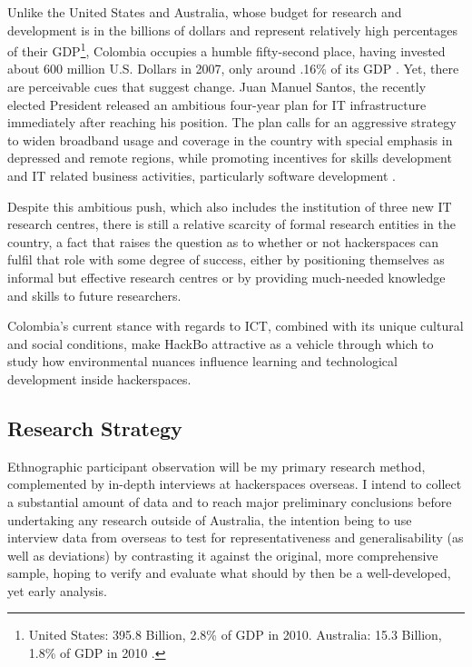 Unlike the United States and Australia, whose budget for research and development is in the billions of dollars and represent relatively high percentages of their GDP\footnote{United States: 395.8 Billion, 2.8\% of GDP in 2010. Australia: 15.3 Billion, 1.8\% of GDP in 2010 \citep{wadsworth10}.}, Colombia occupies a humble fifty-second place, having invested about 600 million U.S. Dollars in 2007, only around .16\% of its GDP \citep[p.82]{unesco10}. Yet, there are perceivable cues that suggest change. Juan Manuel Santos, the recently elected President released an ambitious four-year plan for IT infrastructure immediately after reaching his position. The plan calls for an aggressive strategy to widen broadband usage and coverage in the country with special emphasis in depressed and remote regions, while promoting incentives for skills development and IT related business activities, particularly software development \citep{molano11}. 

Despite this ambitious push, which also includes the institution of three new IT research centres, there is still a relative scarcity of formal research entities in the country, a fact that raises the question as to whether or not hackerspaces can fulfil that role with some degree of success, either by positioning themselves as informal but effective research centres or by providing much-needed knowledge and skills to future researchers. 

Colombia's current stance with regards to ICT, combined with its unique cultural and social conditions, make HackBo attractive as a vehicle through which to study how environmental nuances influence learning and technological development inside hackerspaces.

\subsection{Research Strategy}
\label{strategy}

Ethnographic participant observation will be my primary research method, complemented by in-depth interviews at hackerspaces overseas. I intend to collect a substantial amount of data and to reach major preliminary conclusions before undertaking any research outside of Australia, the intention being to use interview data from overseas to test for representativeness and generalisability (as well as deviations) by contrasting it against the original, more comprehensive sample, hoping to verify and evaluate what should by then be a well-developed, yet early analysis.

